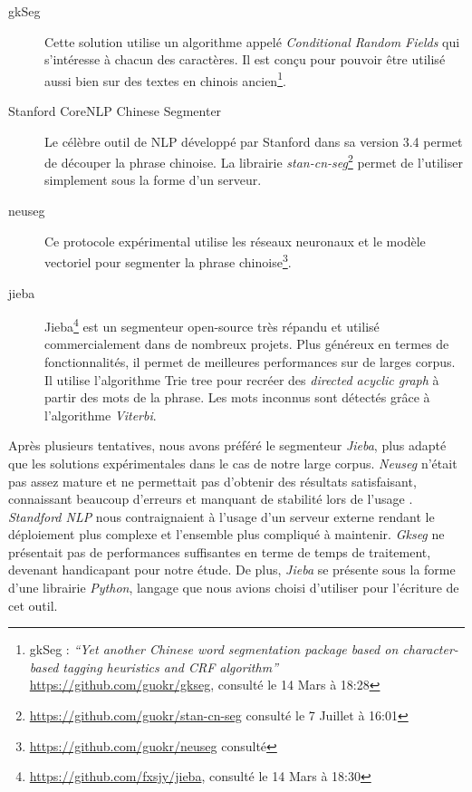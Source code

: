     \begin{description}
        \item[gkSeg] 
        Cette solution utilise un algorithme appelé \textit{Conditional Random Fields} qui s'intéresse à chacun des caractères. Il est conçu pour pouvoir être utilisé aussi bien sur des  textes en chinois ancien\footnote{ gkSeg : \textit{{\textquotedblleft}Yet another Chinese word segmentation package based on character-based tagging heuristics and CRF algorithm{\textquotedblright} }\url{https://github.com/guokr/gkseg}, consulté le 14 Mars à 18:28}.

        \item[Stanford CoreNLP Chinese Segmenter]
        Le célèbre outil de NLP développé par Stanford dans sa version 3.4 permet de découper la phrase chinoise. La librairie \textit{stan-cn-seg}\footnote{\url{https://github.com/guokr/stan-cn-seg} consulté le 7 Juillet à 16:01} permet de l'utiliser simplement sous la forme d'un serveur.

        \item[neuseg]
        Ce protocole expérimental utilise les réseaux neuronaux et le modèle vectoriel pour segmenter la phrase chinoise\footnote{\url{https://github.com/guokr/neuseg} consulté }.

        \item[jieba]
        Jieba\footnote{ \url{https://github.com/fxsjy/jieba}, consulté le 14 Mars à 18:30} est un segmenteur open-source  très répandu et utilisé commercialement dans de nombreux projets. Plus généreux en termes de fonctionnalités, il permet de meilleures performances sur de larges corpus. Il utilise l'algorithme Trie tree pour recréer des \textit{directed acyclic graph} à partir des mots de la phrase. Les mots inconnus sont détectés grâce à l'algorithme \textit{Viterbi}.
    \end{description}

     Après plusieurs tentatives, nous avons préféré le segmenteur \textit{Jieba}, plus adapté que les solutions expérimentales dans le cas de notre large corpus. \textit{Neuseg} n'était pas assez mature et ne permettait pas d'obtenir des résultats satisfaisant, connaissant beaucoup d'erreurs et manquant de stabilité lors de l'usage . \textit{Standford NLP} nous contraignaient à l'usage d'un serveur externe rendant le déploiement plus complexe et l'ensemble plus compliqué à maintenir. \textit{Gkseg} ne présentait pas de performances suffisantes en terme de temps de traitement, devenant handicapant pour notre étude. De plus, \textit{Jieba} se présente sous la forme d'une librairie \textit{Python}, langage que nous avions choisi d'utiliser pour l'écriture de cet outil.

